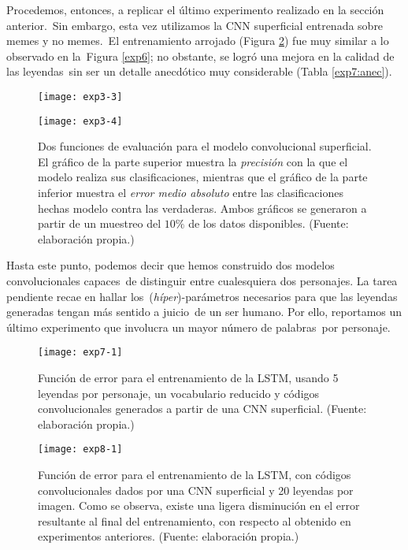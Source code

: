 Procedemos, entonces, a replicar el último experimento realizado en la sección anterior.\
Sin embargo, esta vez utilizamos la CNN superficial entrenada sobre memes y no memes.\
El entrenamiento arrojado (Figura \ref{exp7}) fue muy similar a lo observado en la\
Figura \ref{exp6}; no obstante, se logró una mejora en la calidad de las leyendas\
sin ser un detalle anecdótico muy considerable (Tabla \ref{exp7:anec}).

\begin{figure}[H]
  \centering
  \begin{minipage}[c]{\linewidth}
    \texttt{[image: exp3-3]}
  \end{minipage}\hfill
  \begin{minipage}[c]{\linewidth}
    \texttt{[image: exp3-4]}
  \end{minipage}
  \caption{
    Dos funciones de evaluación para el modelo convolucional superficial.
    El gráfico de la parte superior muestra la \emph{precisión} con la que el modelo realiza
    sus clasificaciones, mientras que el gráfico de la parte inferior muestra el
    \emph{error medio absoluto} entre las clasificaciones hechas modelo contra las verdaderas.
    Ambos gráficos se generaron a partir de un muestreo del $10\%$ de los datos disponibles.
    (Fuente: elaboración propia.)
  }
  \label{eval:exp3}
\end{figure}

Hasta este punto, podemos decir que hemos construido dos modelos convolucionales capaces\
de distinguir entre cualesquiera dos personajes. La tarea pendiente recae en hallar los\
(\emph{híper})-parámetros necesarios para que las leyendas generadas tengan más sentido a juicio\
de un ser humano. Por ello, reportamos un último experimento que involucra un mayor número de palabras\
por personaje.

\begin{figure}[H]
  \texttt{[image: exp7-1]}
  \caption{
    Función de error para el entrenamiento de la LSTM, usando 5 leyendas por personaje,
    un vocabulario reducido y códigos convolucionales generados a partir de una CNN superficial.
    (Fuente: elaboración propia.)
  }
  \label{exp7}
\end{figure}

\begin{figure}[H]
  \texttt{[image: exp8-1]}
  \caption{
    Función de error para el entrenamiento de la LSTM, con códigos convolucionales dados
    por una CNN superficial y 20 leyendas por imagen. Como se observa, existe una ligera
    disminución en el error resultante al final del entrenamiento, con respecto al obtenido
    en experimentos anteriores.
    (Fuente: elaboración propia.)
  }
  \label{exp8}
\end{figure}

